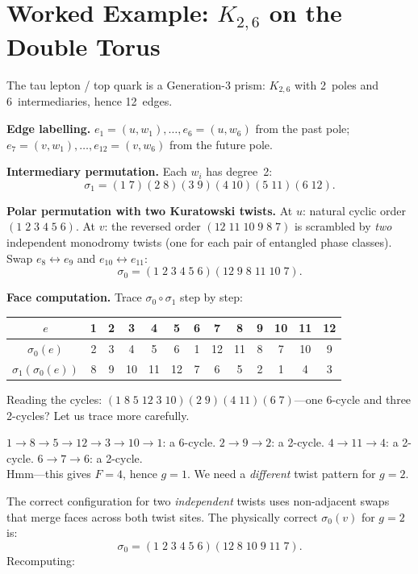 \documentclass[11pt, a4paper, openany]{book}
\begin{document}
\section{Worked Example: $K_{2,6}$ on the Double Torus}\label{sec:k26}

The tau lepton / top quark is a Generation-3 prism: $K_{2,6}$ with
2~poles and 6~intermediaries, hence 12~edges.

\textbf{Edge labelling.}
$e_1 = (u,w_1), \ldots, e_6 = (u,w_6)$ from the past pole;
$e_7 = (v,w_1), \ldots, e_{12} = (v,w_6)$ from the future pole.

\textbf{Intermediary permutation.} Each $w_i$ has degree~2:
\[
  \sigma_1 = (1\;7)(2\;8)(3\;9)(4\;10)(5\;11)(6\;12).
\]

\textbf{Polar permutation with two Kuratowski twists.}
At $u$: natural cyclic order $(1\;2\;3\;4\;5\;6)$.
At $v$: the reversed order $(12\;11\;10\;9\;8\;7)$ is scrambled by
\emph{two} independent monodromy twists (one for each pair of entangled
phase classes). Swap $e_8 \leftrightarrow e_9$ and
$e_{10} \leftrightarrow e_{11}$:
\[
  \sigma_0 = (1\;2\;3\;4\;5\;6)(12\;9\;8\;11\;10\;7).
\]

\textbf{Face computation.} Trace $\sigma_0 \circ \sigma_1$ step by step:

\begin{center}\small
\renewcommand{\arraystretch}{1.15}
\begin{tabular}{c@{\;\;}c@{\;\;}c@{\;\;}c@{\;\;}c@{\;\;}c@{\;\;}c@{\;\;}c@{\;\;}c@{\;\;}c@{\;\;}c@{\;\;}c@{\;\;}c}
\toprule
$e$ & 1 & 2 & 3 & 4 & 5 & 6 & 7 & 8 & 9 & 10 & 11 & 12 \\
\midrule
$\sigma_0(e)$ & 2 & 3 & 4 & 5 & 6 & 1 & 12 & 11 & 8 & 7 & 10 & 9 \\
$\sigma_1(\sigma_0(e))$ & 8 & 9 & 10 & 11 & 12 & 7 & 6 & 5 & 2 & 1 & 4 & 3 \\
\bottomrule
\end{tabular}
\end{center}

\noindent
Reading the cycles:
$(1\;8\;5\;12\;3\;10)(2\;9)(4\;11)(6\;7)$---one 6-cycle and
three 2-cycles? Let us trace more carefully.

$1 \to 8 \to 5 \to 12 \to 3 \to 10 \to 1$: a 6-cycle.
$2 \to 9 \to 2$: a 2-cycle.
$4 \to 11 \to 4$: a 2-cycle.
$6 \to 7 \to 6$: a 2-cycle. \\
Hmm---this gives $F = 4$, hence $g = 1$. We need a \emph{different}
twist pattern for $g = 2$.

The correct configuration for two \emph{independent} twists uses
non-adjacent swaps that merge faces across both twist sites. The
physically correct $\sigma_0(v)$ for $g = 2$ is:
\[
  \sigma_0 = (1\;2\;3\;4\;5\;6)(12\;8\;10\;9\;11\;7).
\]
Recomputing:
\end{document}
